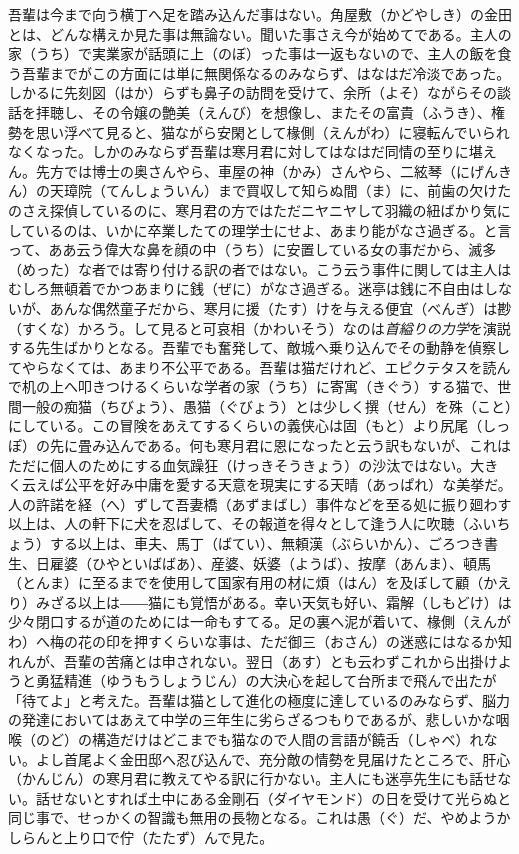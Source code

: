 \documentclass{book}
\begin{document}
吾輩は今まで向う横丁へ足を踏み込んだ事はない。角屋敷（かどやしき）の金田とは、どんな構えか見た事は無論ない。聞いた事さえ今が始めてである。主人の家（うち）で実業家が話頭に上（のぼ）った事は一返もないので、主人の飯を食う吾輩までがこの方面には単に無関係なるのみならず、はなはだ冷淡であった。しかるに先刻図（はか）らずも鼻子の訪問を受けて、余所（よそ）ながらその談話を拝聴し、その令嬢の艶美（えんび）を想像し、またその富貴（ふうき）、権勢を思い浮べて見ると、猫ながら安閑として椽側（えんがわ）に寝転んでいられなくなった。しかのみならず吾輩は寒月君に対してはなはだ同情の至りに堪えん。先方では博士の奥さんやら、車屋の神（かみ）さんやら、二絃琴（にげんきん）の天璋院（てんしょういん）まで買収して知らぬ間（ま）に、前歯の欠けたのさえ探偵しているのに、寒月君の方ではただニヤニヤして羽織の紐ばかり気にしているのは、いかに卒業したての理学士にせよ、あまり能がなさ過ぎる。と言って、ああ云う偉大な鼻を顔の中（うち）に安置している女の事だから、滅多（めった）な者では寄り付ける訳の者ではない。こう云う事件に関しては主人はむしろ無頓着でかつあまりに銭（ぜに）がなさ過ぎる。迷亭は銭に不自由はしないが、あんな偶然童子だから、寒月に援（たす）けを与える便宜（べんぎ）は尠（すくな）かろう。して見ると可哀相（かわいそう）なのは\emph{首縊りの力学}を演説する先生ばかりとなる。吾輩でも奮発して、敵城へ乗り込んでその動静を偵察してやらなくては、あまり不公平である。吾輩は猫だけれど、エピクテタスを読んで机の上へ叩きつけるくらいな学者の家（うち）に寄寓（きぐう）する猫で、世間一般の痴猫（ちびょう）、愚猫（ぐびょう）とは少しく撰（せん）を殊（こと）にしている。この冒険をあえてするくらいの義侠心は固（もと）より尻尾（しっぽ）の先に畳み込んである。何も寒月君に恩になったと云う訳もないが、これはただに個人のためにする血気躁狂（けっきそうきょう）の沙汰ではない。大きく云えば公平を好み中庸を愛する天意を現実にする天晴（あっぱれ）な美挙だ。人の許諾を経（へ）ずして吾妻橋（あずまばし）事件などを至る処に振り廻わす以上は、人の軒下に犬を忍ばして、その報道を得々として逢う人に吹聴（ふいちょう）する以上は、車夫、馬丁（ばてい）、無頼漢（ぶらいかん）、ごろつき書生、日雇婆（ひやといばばあ）、産婆、妖婆（ようば）、按摩（あんま）、頓馬（とんま）に至るまでを使用して国家有用の材に煩（はん）を及ぼして顧（かえり）みざる以上は――猫にも覚悟がある。幸い天気も好い、霜解（しもどけ）は少々閉口するが道のためには一命もすてる。足の裏へ泥が着いて、椽側（えんがわ）へ梅の花の印を押すくらいな事は、ただ御三（おさん）の迷惑にはなるか知れんが、吾輩の苦痛とは申されない。翌日（あす）とも云わずこれから出掛けようと勇猛精進（ゆうもうしょうじん）の大決心を起して台所まで飛んで出たが「待てよ」と考えた。吾輩は猫として進化の極度に達しているのみならず、脳力の発達においてはあえて中学の三年生に劣らざるつもりであるが、悲しいかな咽喉（のど）の構造だけはどこまでも猫なので人間の言語が饒舌（しゃべ）れない。よし首尾よく金田邸へ忍び込んで、充分敵の情勢を見届けたところで、肝心（かんじん）の寒月君に教えてやる訳に行かない。主人にも迷亭先生にも話せない。話せないとすれば土中にある金剛石（ダイヤモンド）の日を受けて光らぬと同じ事で、せっかくの智識も無用の長物となる。これは愚（ぐ）だ、やめようかしらんと上り口で佇（たたず）んで見た。\\
\end{document}
